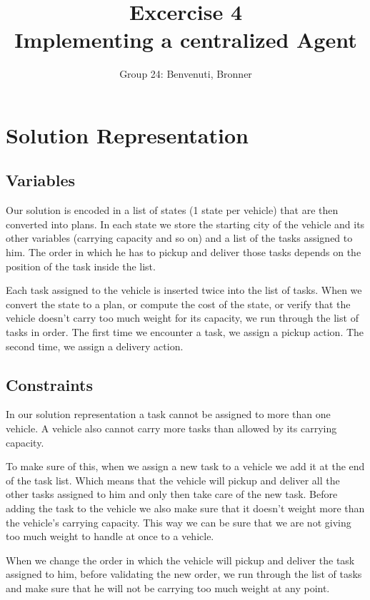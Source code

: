 \documentclass[11pt]{article}
\title{\bf Excercise 4\\ Implementing a centralized Agent}
\author{Group 24: Benvenuti, Bronner}
\begin{document}
\maketitle

\section{Solution Representation}

\subsection{Variables}
Our solution is encoded in a list of states (1 state per vehicle) that are then converted into plans. In each state we store the starting city of the vehicle and its other variables (carrying capacity and so on) and a list of the tasks assigned to him. The order in which he has to pickup and deliver those tasks depends on the position of the task inside the list.

Each task assigned to the vehicle is inserted twice into the list of tasks. When we convert the state to a plan, or compute the cost of the state, or verify that the vehicle doesn't carry too much weight for its capacity, we run through the list of tasks in order. The first time we encounter a task, we assign a pickup action. The second time, we assign a delivery action. 

\subsection{Constraints}
In our solution representation a task cannot be assigned to more than one vehicle. A vehicle also cannot carry more tasks than allowed by its carrying capacity.

To make sure of this, when we assign a new task to a vehicle we add it at the end of the task list. Which means that the vehicle will pickup and deliver all the other tasks assigned to him and only then take care of the new task. Before adding the task to the vehicle we also make sure that it doesn't weight more than the vehicle's carrying capacity. This way we can be sure that we are not giving too much weight to handle at once to a vehicle.

When we change the order in which the vehicle will pickup and deliver the task assigned to him, before validating the new order, we run through the list of tasks and make sure that he will not be carrying too much weight at any point.
\end{document}
